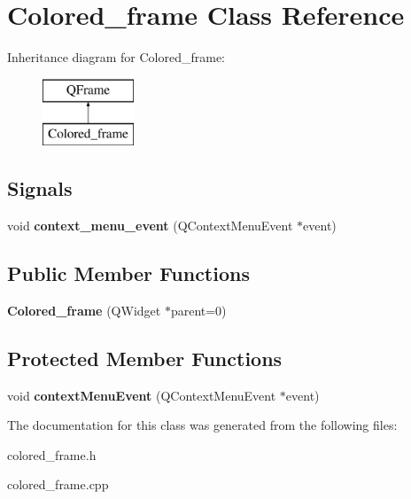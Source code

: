 \hypertarget{class_colored__frame}{\section{Colored\-\_\-frame Class Reference}
\label{class_colored__frame}
}
Inheritance diagram for Colored\-\_\-frame\-:\begin{figure}[H]
\begin{center}
\leavevmode
\includegraphics[height=2.000000cm]{class_colored__frame}
\end{center}
\end{figure}
\subsection*{Signals}
\begin{DoxyCompactItemize}
\item 
\hypertarget{class_colored__frame_a6cda11e629446453b6fb82713dd0f90c}{void {\bfseries context\-\_\-menu\-\_\-event} (Q\-Context\-Menu\-Event $\ast$event)}\label{class_colored__frame_a6cda11e629446453b6fb82713dd0f90c}

\end{DoxyCompactItemize}
\subsection*{Public Member Functions}
\begin{DoxyCompactItemize}
\item 
\hypertarget{class_colored__frame_af3467308e21caa00d1adc79e955d98e7}{{\bfseries Colored\-\_\-frame} (Q\-Widget $\ast$parent=0)}\label{class_colored__frame_af3467308e21caa00d1adc79e955d98e7}

\end{DoxyCompactItemize}
\subsection*{Protected Member Functions}
\begin{DoxyCompactItemize}
\item 
\hypertarget{class_colored__frame_a17c87281afca4a5f948f766af96e2f84}{void {\bfseries context\-Menu\-Event} (Q\-Context\-Menu\-Event $\ast$event)}\label{class_colored__frame_a17c87281afca4a5f948f766af96e2f84}

\end{DoxyCompactItemize}


The documentation for this class was generated from the following files\-:\begin{DoxyCompactItemize}
\item 
colored\-\_\-frame.\-h\item 
colored\-\_\-frame.\-cpp\end{DoxyCompactItemize}
